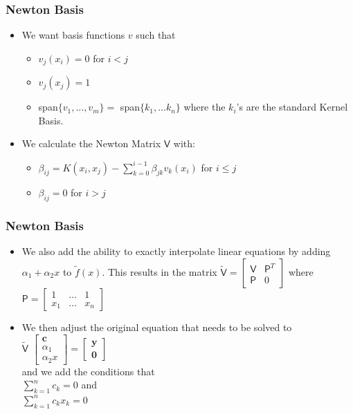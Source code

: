 \documentclass{beamer}
\begin{document}
\begin{frame}
\frametitle{Newton Basis}
\begin{itemize}
\item We want basis functions $v$ such that
	\begin{itemize}
	\item $v_j(x_i)=0$ for $i<j$
	\item $v_j(x_j)=1$
	\item span$\{v_1, ... , v_m\}=$ span$\{k_1, ... k_n\}$ where the $k_i$'s are the standard Kernel Basis.
	\end{itemize}
\item We calculate the Newton Matrix $\mathsf{V}$ with: 
\begin{itemize}
\item $\beta_{ij}=K(x_i,x_j)-\sum\limits^{i-1}_{k=0}{\beta_{jk}v_{k}(x_i)}$ for $i\leq j$
\item  $\beta_{ij}= 0$ for $i>j$
\end{itemize}
\end{itemize}
\end{frame}

\begin{frame}
\frametitle{Newton Basis}
\begin{itemize}
\item We also add the ability to exactly interpolate linear equations by adding $\alpha_1+\alpha_2 x$ to $\tilde{f}(x)$. This results in the matrix
$\tilde{\mathsf{V}}=$$\begin{bmatrix}
\mathsf{V}&\mathsf{P}^T\\\mathsf{P}&0
\end{bmatrix}$
where
$\mathsf{P}=\begin{bmatrix}
1&...&1\\
x_1 &... &x_n
\end{bmatrix}$
\item We then adjust the original equation that needs to be solved to\\ $\tilde{\mathsf{V}}$
$\begin{bmatrix}
\mathbf{c}\\
\alpha_1\\
\alpha_2 x
\end{bmatrix}=\begin{bmatrix}
\mathbf{y}\\
\mathbf{0}
\end{bmatrix}$ \\
and we add the conditions that \\$\sum\limits^n_{k=1}c_k = 0$ and \\$\sum\limits^n_{k=1}c_{k}x_k = 0$
\end{itemize}
\nocite{fass07}
\end{frame}
\end{document}
